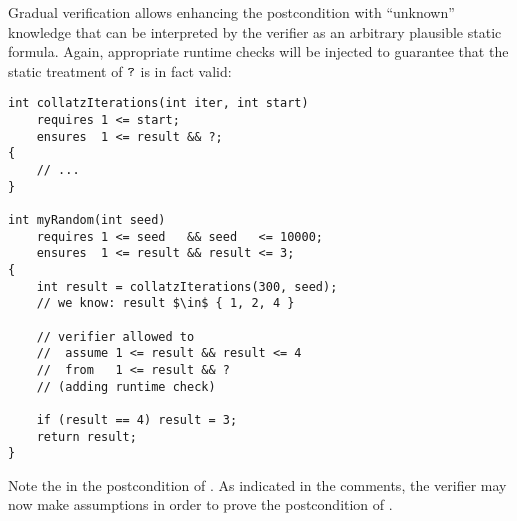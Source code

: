 Gradual verification allows enhancing the postcondition with “unknown” knowledge that can be interpreted by the verifier as an arbitrary plausible static formula.
Again, appropriate runtime checks will be injected to guarantee that the static treatment of $\textup{\texttt{?}}$ is in fact valid:
\begin{lstlisting}
int collatzIterations(int iter, int start)
    requires 1 <= start;
    ensures  1 <= result && ?;
{
    // ...
}

int myRandom(int seed)
    requires 1 <= seed   && seed   <= 10000;
    ensures  1 <= result && result <= 3;
{
    int result = collatzIterations(300, seed);
    // we know: result $\in$ { 1, 2, 4 }
    
    // verifier allowed to
    //  assume 1 <= result && result <= 4
    //  from   1 <= result && ?
    // (adding runtime check)
    
    if (result == 4) result = 3;
    return result;
}
\end{lstlisting}
Note the  in the postcondition of .
As indicated in the comments, the verifier may now make assumptions in order to prove the postcondition of .



% 


